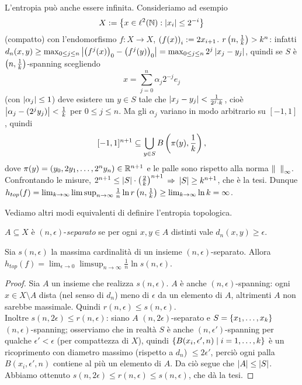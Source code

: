 \begin{esempio}L'entropia può anche essere infinita. Consideriamo ad esempio
\[ X:=\left\{x\in\ell^2(\mathbb{N}):\left|x_i\right|\le 2^{-i}\right\} \]
(compatto) con l'endomorfismo $f:X\to X$, $\left(f(x)\right)_i:=2x_{i+1}$. \Eacc $r\left(n,\frac{1}{k}\right)>k^n$:
infatti $d_n(x,y)\ge\max_{0\le j\le n}\left|\left(f^j(x)\right)_0-\left(f^j(y)\right)_0\right|=\max_{0\le j\le n}2^j\left|x_j-y_j\right|$,
quindi se $S$ è $\left(n,\frac{1}{k}\right)$-spanning scegliendo
\[ x=\sum_{j=0}^n\alpha_j 2^{-j}e_j \]
(con $\left|\alpha_j\right|\le 1$) deve esistere un $y\in S$ tale che $\left|x_j-y_j\right|<\frac{1}{2^j\cdot k}$,
cioè $\left|\alpha_j-(2^j y_j)\right|<\frac{1}{k}$ per $0\le j\le n$.
Ma gli $\alpha_j$ variano in modo arbitrario su $[-1,1]$, quindi
\[ [-1,1]^{n+1}\subseteq \bigcup_{y\in S}B\left(\pi(y),\frac{1}{k}\right), \]
dove $\pi(y)=(y_0,2y_1,\dots,2^n y_n)\in \mathbb{R}^{n+1}$ e le palle sono rispetto alla norma $\norm{\fantasma{a}}_\infty$.
Confrontando le misure, $2^{n+1}\le \left|S\right|\cdot\left(\frac{2}{k}\right)^{n+1}$ $\Rightarrow$ $\left|S\right|\ge k^{n+1}$, che è la tesi. 
Dunque $h_{top}(f)=\lim_{k\to\infty}\limsup_{n\to\infty}\frac{1}{n}\ln r\left(n,\frac{1}{k}\right)\ge\lim_{k\to\infty}\ln k=\infty$.
\end{esempio}

Vediamo altri modi equivalenti di definire l'entropia topologica.

\begin{defi}$A\subseteq X$ è $(n,\epsilon)$-\emph{separato} se per ogni $x,y\in A$ distinti
vale $d_n(x,y)\ge\epsilon$.
\end{defi}

\begin{prop}Sia $s(n,\epsilon)$ la massima cardinalità di un insieme $(n,\epsilon)$-separato.
Allora $h_{top}(f)=\lim_{\epsilon\to 0}\limsup_{n\to\infty}\frac{1}{n}\ln s(n,\epsilon)$.
\end{prop}

\begin{proof}Sia $A$ un insieme che realizza $s(n,\epsilon)$. $A$ è anche $(n,\epsilon)$-spanning:
ogni $x\in X\setminus A$ dista (nel senso di $d_n$) meno di $\epsilon$ da un elemento di $A$, altrimenti $A$
non sarebbe massimale. Quindi $r(n,\epsilon)\le s(n,\epsilon)$. \\
Inoltre $s(n,2\epsilon)\le r(n,\epsilon)$: siano $A$ $(n,2\epsilon)$-separato
e $S=\left\{x_1,\dots,x_k\right\}$ $(n,\epsilon)$-spanning; osserviamo che in realtà
$S$ è anche $(n,\epsilon')$-spanning per qualche $\epsilon'<\epsilon$ (per compattezza di $X$),
quindi $\left\{B(x_i,\epsilon',n)\mid i=1,\dots,k\right\}$ è un ricoprimento con diametro massimo (rispetto a $d_n$) $\le 2\epsilon'$,
perciò ogni palla $B(x_i,\epsilon',n)$ contiene al più un elemento di $A$.
Da ciò segue che $\left|A\right|\le\left|S\right|$. \\
Abbiamo ottenuto $s(n,2\epsilon)\le r(n,\epsilon)\le s(n,\epsilon)$, che dà la tesi.
\end{proof}

